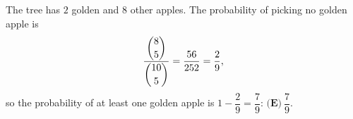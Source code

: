 The tree has $2$ golden and $8$ other apples. The probability of picking no golden apple is
\[\dfrac{\dbinom85}{\dbinom{10}{5}}=\dfrac{56}{252}=\dfrac29,\]
so the probability of at least one golden apple is $1-\dfrac29=\dfrac79$: $\boxed{\textbf{(E)}\ \dfrac79}$.
